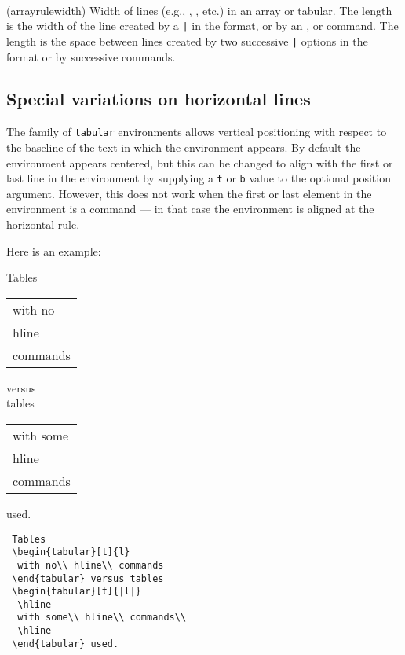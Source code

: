 {{{{{{\begin{syntax}
\lnc{\arrayrulewidth} \lnc{\doublerulesep} \\
\end{syntax}
\glossary(arrayrulewidth)%
  {}%
  {Width of lines (e.g., , , etc.) in an array or tabular.}
The length \lnc{\arrayrulewidth} is the width of the line created by
a \verb?|? in the format, or by an \cmd{\hline}, \cmd{\cline} or
\cmd{\vline} command. The length \lnc{\doublerulesep} is the space
between lines created by two successive \verb?|? options in the format
or by successive \cmd{\hline} commands.


\subsection{Special variations on horizontal lines}

 The family of \texttt{tabular} environments allows
vertical positioning 
with respect to the baseline of
the text in which the environment appears.  By default the
environment appears centered, but this can be changed to
align with the first or last line in the environment by
supplying a \texttt{t} or \texttt{b} value to the
optional position argument. However, this does not work
when the first or last element in the environment is a
\cmd{\hline} command --- in that case the environment is
aligned at the horizontal rule.

 \pagebreak[3]

 Here is an example:
 \begin{center}
 \begin{minipage}[t]{.4\linewidth}
 Tables
 \begin{tabular}[t]{l}
   with no\\ hline\\ commands 
 \end{tabular} versus \\ tables
 \begin{tabular}[t]{|l|}
  \hline
  with some\\ hline\\ commands\\
  \hline
 \end{tabular} used.
 \end{minipage}
 \begin{minipage}[t]{.52\linewidth}
 \begin{verbatim}
 Tables
 \begin{tabular}[t]{l}
  with no\\ hline\\ commands
 \end{tabular} versus tables
 \begin{tabular}[t]{|l|}
  \hline
  with some\\ hline\\ commands\\
  \hline
 \end{tabular} used.
 \end{verbatim}
 \end{minipage}
\end{center}

}}}}}}
